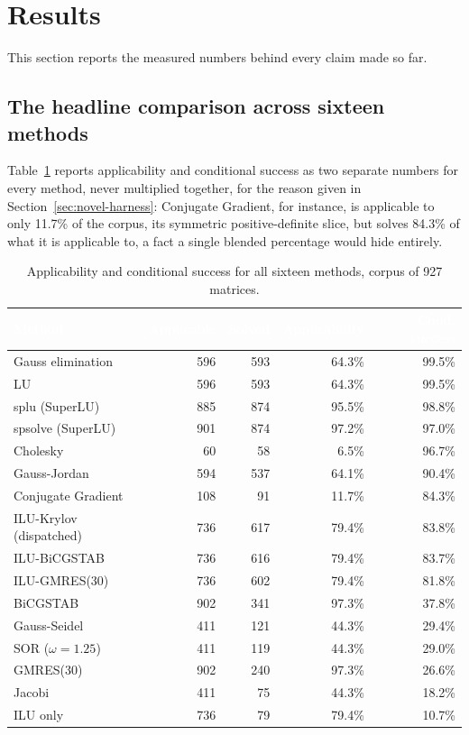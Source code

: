 \documentclass[11pt,a4paper]{article}
\newcommand{\hdrow}{\rowcolor{SBnavy}}
\newcommand{\hdtxt}[1]{\textcolor{white}{\bfseries #1}}
\begin{document}
\clearpage
\section{Results}
\label{sec:results}

This section reports the measured numbers behind every claim made so far.

\subsection{The headline comparison across sixteen methods}
\label{sec:results-headline}

Table~\ref{tab:headline} reports applicability and conditional success as two separate
numbers for every method, never multiplied together, for the reason given in
Section~\ref{sec:novel-harness}: Conjugate Gradient, for instance, is applicable to only
11.7\% of the corpus, its symmetric positive-definite slice, but solves 84.3\% of what it
is applicable to, a fact a single blended percentage would hide entirely.

\begin{table}[H]
\centering
\caption{Applicability and conditional success for all sixteen methods, corpus of 927
matrices.}
\label{tab:headline}
\small
\begin{tabular}{lrrrr}
\toprule
\hdrow \hdtxt{Method} & \hdtxt{Applicable} & \hdtxt{Solved} & \hdtxt{Applicability} & \hdtxt{Cond. success} \\
\midrule
Gauss elimination & 596 & 593 & 64.3\% & 99.5\% \\
\rowcolor{SBlight} LU & 596 & 593 & 64.3\% & 99.5\% \\
splu (SuperLU) & 885 & 874 & 95.5\% & 98.8\% \\
\rowcolor{SBlight} spsolve (SuperLU) & 901 & 874 & 97.2\% & 97.0\% \\
Cholesky & 60 & 58 & 6.5\% & 96.7\% \\
\rowcolor{SBlight} Gauss-Jordan & 594 & 537 & 64.1\% & 90.4\% \\
Conjugate Gradient & 108 & 91 & 11.7\% & 84.3\% \\
\rowcolor{SBlight} ILU-Krylov (dispatched) & 736 & 617 & 79.4\% & 83.8\% \\
ILU-BiCGSTAB & 736 & 616 & 79.4\% & 83.7\% \\
\rowcolor{SBlight} ILU-GMRES(30) & 736 & 602 & 79.4\% & 81.8\% \\
BiCGSTAB & 902 & 341 & 97.3\% & 37.8\% \\
\rowcolor{SBlight} Gauss-Seidel & 411 & 121 & 44.3\% & 29.4\% \\
SOR ($\omega=1.25$) & 411 & 119 & 44.3\% & 29.0\% \\
\rowcolor{SBlight} GMRES(30) & 902 & 240 & 97.3\% & 26.6\% \\
Jacobi & 411 & 75 & 44.3\% & 18.2\% \\
\rowcolor{SBlight} ILU only & 736 & 79 & 79.4\% & 10.7\% \\
\bottomrule
\end{tabular}
\end{table}
\end{document}
